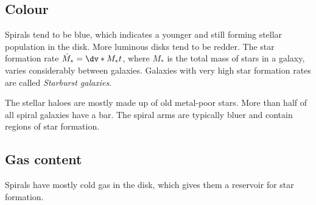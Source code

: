 \subsection{Colour}
Spirals tend to be blue, which indicates a younger and still forming stellar population in the disk.
More luminous disks tend to be redder.
The star formation rate $\dot{M}_* = \dv*{M_*}{t}$, where $M_*$ is the total mass of stars in a galaxy, varies considerably between galaxies.
Galaxies with very high star formation rates are called \emph{Starburst galaxies}.

The stellar haloes are mostly made up of old metal-poor stars.
More than half of all spiral galaxies have a bar.
The spiral arms are typically bluer and contain regions of star formation.

\subsection{Gas content}
Spirals have mostly cold gas in the disk, which gives them a reservoir for star formation.

